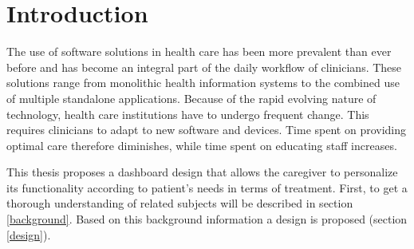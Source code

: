 \section{Introduction}

The use of software solutions in health care has been more prevalent than ever before and has become an integral part of the daily workflow of clinicians. These solutions range from monolithic health information systems to the combined use of multiple standalone applications. Because of the rapid evolving nature of technology, health care institutions have to undergo frequent change. This requires clinicians to adapt to new software and devices. Time spent on providing optimal care therefore diminishes, while time spent on educating staff increases.



This thesis proposes a dashboard design that allows the caregiver to personalize its functionality according to patient's needs in terms of treatment. First, to get a thorough understanding of related subjects will be described in section \ref{background}. Based on this background information a design is proposed (section \ref{design}).